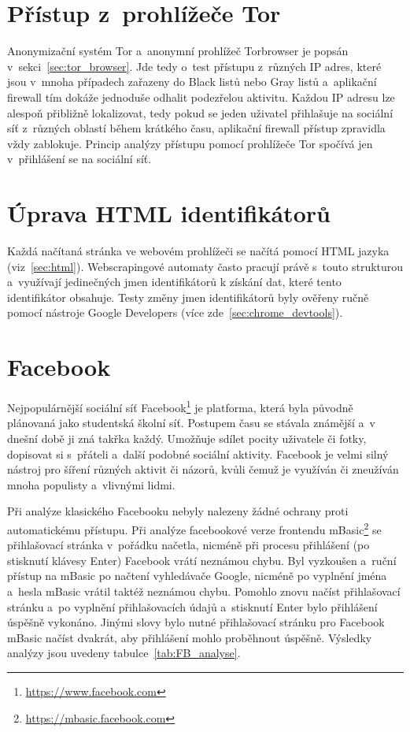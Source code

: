 \section*{Přístup z~prohlížeče Tor}
Anonymizační systém Tor a~anonymní prohlížeč Torbrowser je popsán v~sekci~\ref{sec:tor_browser}. Jde tedy o~test přístupu z~různých IP adres, které jsou v~mnoha případech zařazeny do Black listů nebo Gray listů a~aplikační firewall tím dokáže jednoduše odhalit podezřelou aktivitu. Každou IP adresu lze alespoň přibližně lokalizovat, tedy pokud se jeden uživatel přihlašuje na sociální síť z~různých oblastí během krátkého času, aplikační firewall přístup zpravidla vždy zablokuje. Princip analýzy přístupu pomocí prohlížeče Tor spočívá jen v~přihlášení se na sociální síť.

\section*{Úprava HTML identifikátorů}
Každá načítaná stránka ve webovém prohlížeči se načítá pomocí HTML jazyka (viz~\ref{sec:html}). Webscrapingové automaty často pracují právě s~touto strukturou a~využívají jedinečných jmen identifikátorů k získání dat, které tento identifikátor obsahuje. Testy změny jmen identifikátorů byly ověřeny ručně pomocí nástroje Google Developers (více zde~\ref{sec:chrome_devtools}). 

\section{Facebook}
Nejpopulárnější sociální síť Facebook\footnote{\href{https://www.facebook.com}{https://www.facebook.com}} je platforma, která byla původně plánovaná jako studentská školní síť. Postupem času se stávala známější a~v dnešní době ji zná takřka každý. Umožňuje sdílet pocity uživatele či fotky, dopisovat si s~přáteli a~další podobné sociální aktivity. Facebook je velmi silný nástroj pro šíření různých aktivit či názorů, kvůli čemuž je využíván či zneužíván mnoha populisty a~vlivnými lidmi.

Při analýze klasického Facebooku nebyly nalezeny žádné ochrany proti automatickému přístupu. Při analýze facebookové verze frontendu mBasic\footnote{\href{https://mbasic.facebook.com}{https://mbasic.facebook.com}} se přihlašovací stránka v~pořádku načetla, nicméně při procesu přihlášení (po stisknutí klávesy Enter) Facebook vrátí neznámou chybu. Byl vyzkoušen a~ruční přístup na mBasic po načtení vyhledávače Google, nicméně po vyplnění jména a~hesla mBasic vrátil taktéž neznámou chybu. Pomohlo znovu načíst přihlašovací stránku a~po vyplnění přihlašovacích údajů a~stisknutí Enter bylo přihlášení úspěšně vykonáno. Jinými slovy bylo nutné přihlašovací stránku pro Facebook mBasic načíst dvakrát, aby přihlášení mohlo proběhnout úspěšně. Výsledky analýzy jsou uvedeny tabulce~\ref{tab:FB_analyse}.


